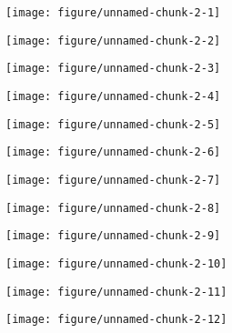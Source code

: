 \documentclass[10pt,a4paper]{article}\usepackage[]{graphicx}\usepackage[]{color}
\makeatletter
\def\maxwidth{ %
  \ifdim\Gin@nat@width>\linewidth
    \linewidth
  \else
    \Gin@nat@width
  \fi
}
\makeatother
\begin{document}
\texttt{[image: figure/unnamed-chunk-2-1]} 

\newpage

\texttt{[image: figure/unnamed-chunk-2-2]} 

\newpage

\texttt{[image: figure/unnamed-chunk-2-3]} 

\newpage

\texttt{[image: figure/unnamed-chunk-2-4]} 

\newpage

\texttt{[image: figure/unnamed-chunk-2-5]} 

\newpage

\texttt{[image: figure/unnamed-chunk-2-6]} 

\newpage

\texttt{[image: figure/unnamed-chunk-2-7]} 

\newpage

\texttt{[image: figure/unnamed-chunk-2-8]} 

\newpage

\texttt{[image: figure/unnamed-chunk-2-9]} 

\newpage

\texttt{[image: figure/unnamed-chunk-2-10]} 

\newpage

\texttt{[image: figure/unnamed-chunk-2-11]} 

\newpage

\texttt{[image: figure/unnamed-chunk-2-12]} 

\newpage
\end{document}
